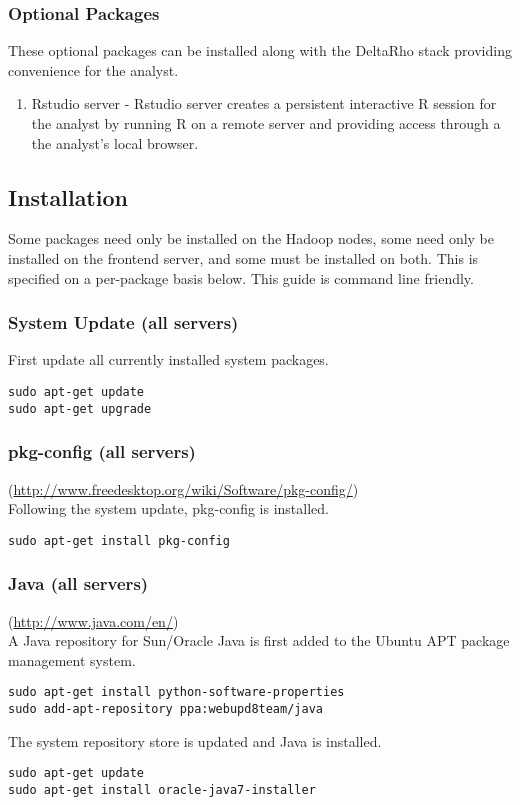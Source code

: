 \subsubsection{Optional Packages}
These optional packages can be installed along with the DeltaRho stack providing convenience for the analyst.
\begin{enumerate}
\item Rstudio server - Rstudio server creates a persistent interactive R session for the analyst by running R on a remote server and providing access through a the analyst's local browser.
\end{enumerate}

\newpage

\subsection{Installation}
Some packages need only be installed on the Hadoop nodes, some need only
be installed on the frontend server, and some must be installed on both.
This is specified on a per-package basis below. This guide is command
line friendly.


\subsubsection{System Update (all servers)}
First update all currently installed system packages.

\begin{verbatim}
sudo apt-get update
sudo apt-get upgrade
\end{verbatim}

\subsubsection{pkg-config (all servers)} (\url{http://www.freedesktop.org/wiki/Software/pkg-config/})\\
Following the system update, pkg-config is installed.
\begin{verbatim}
sudo apt-get install pkg-config
\end{verbatim}

\subsubsection{Java (all servers)} (\url{http://www.java.com/en/})\\
A Java repository for Sun/Oracle Java is first added to the Ubuntu APT package management system.
\begin{verbatim}
sudo apt-get install python-software-properties
sudo add-apt-repository ppa:webupd8team/java
\end{verbatim}
The system repository store is updated and Java is installed.
\begin{verbatim}
sudo apt-get update
sudo apt-get install oracle-java7-installer
\end{verbatim}

